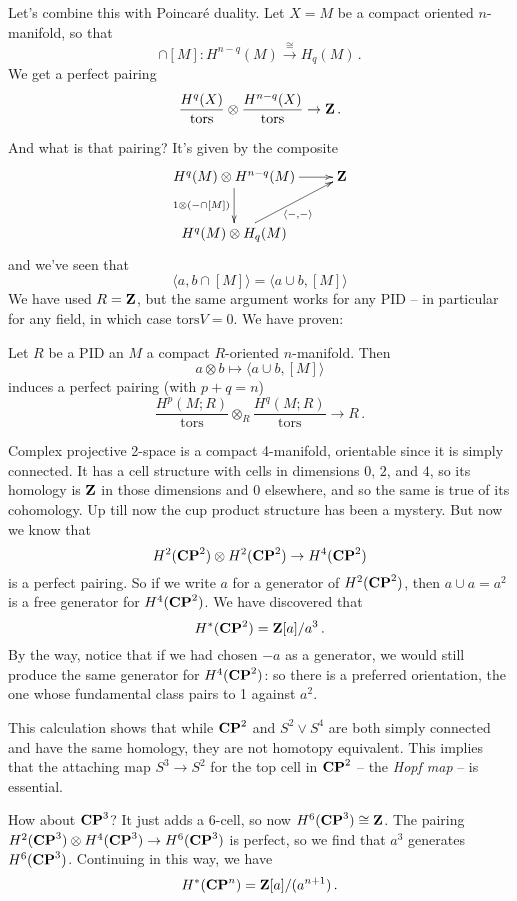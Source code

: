 Let's combine this with Poincar\'e duality.
Let $X=M$ be a compact oriented $n$-manifold, so that
\[
\cap[M]:H^{n-q}(M)\xrightarrow{\cong}H_q(M)\,.
\]
We get a perfect pairing
\[
\frac{H^q(X)}{\mathrm{tors}}\otimes\frac{H^{n-q}(X)}{\mathrm{tors}}\to\mathbf Z\,.
\]

And what is that pairing? It's given by the composite
\begin{equation*}
\xymatrix{
	H^q(M)\otimes H^{n-q}(M)\ar[r]\ar[d]_{1\otimes(-\cap [M])} & \Z\\
	H^q(M)\otimes H_q(M)\ar[ur]_{\langle-,-\rangle}
}
\end{equation*}
and we've seen that 
\begin{equation*}
\langle a,b\cap [M]\rangle = \langle a\cup b,[M]\rangle
\end{equation*}
We have used $R=\mathbf Z$, but the same argument works for any PID -- in particular
for any field, in which case $\mathrm{tors}V=0$. We have proven:
\begin{theorem} Let $R$ be a PID an $M$ a compact $R$-oriented $n$-manifold. 
Then 
\begin{equation*}
a\otimes b\mapsto\langle a\cup b,[M]\rangle
\end{equation*}
induces a perfect pairing (with $p+q=n$)
\[
\frac{H^p(M;R)}{\mathrm{tors}}\otimes_R\frac{H^q(M;R)}{\mathrm{tors}}\to R\,.
\]
\end{theorem}
\begin{example}
Complex projective 2-space is a compact 4-manifold, orientable since it is 
simply 
connected. It has a cell structure with cells in dimensions $0$, $2$, and $4$,
so its homology is $\mathbf Z$ in those dimensions and 0 elsewhere, and so the same is
true of its cohomology. Up till now the cup product structure has been a 
mystery. But now we know that 
\[
H^2(\mathbf{CP}^2)\otimes H^2(\mathbf{CP}^2)\to H^4(\mathbf{CP}^2)
\]
is a perfect pairing. So if we write $a$ for a generator of $H^2(\mathbf{CP}^2)$,
then $a\cup a=a^2$ is a free generator for $H^4(\mathbf{CP}^2)$. We have discovered 
that 
\[
H^*(\mathbf{CP}^2)=\mathbf Z[a]/a^3\,.
\]
By the way, notice that if we had chosen $-a$ as a generator, we would still
produce the same generator for $H^4(\mathbf{CP}^2)$: so there is a preferred
orientation, the one whose fundamental class pairs to 1 against $a^2$. 

This calculation shows that while $\mathbf{CP}^2$ and $S^2\vee S^4$ are both
simply connected and have the same homology, they are not homotopy
equivalent. This implies that the attaching map $S^3\to S^2$ for the top
cell in $\mathbf{CP}^2$ -- the {\em Hopf map} -- is essential.

How about $\mathbf{CP}^3$? It just adds a $6$-cell, so now $H^6(\mathbf{CP}^3)\cong\mathbf Z$.
The pairing $H^2(\mathbf{CP}^3)\otimes H^4(\mathbf{CP}^3)\to H^6(\mathbf{CP}^3)$ is perfect, so we
find that $a^3$ generates $H^6(\mathbf{CP}^3)$. Continuing in this way, we have
\[
H^\ast(\mathbf{CP}^n)=\mathbf Z[a]/(a^{n+1})\,.
\]
\end{example}
